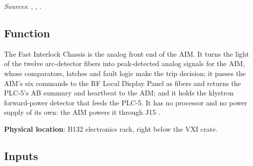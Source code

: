 \emph{Sources}: , , .


\subsection{Function}\label{sec:fastic-function}


The Fast Interlock Chassis is the analog front end of the AIM. It turns the light of the twelve arc-detector fibers into peak-detected analog signals for the AIM, whose comparators, latches and fault logic make the trip decision; it passes the AIM's six commands to the RF Local Display Panel as fibers and returns the PLC-5's AB summary and heartbeat to the AIM; and it holds the klystron forward-power detector that feeds the PLC-5. It has no processor and no power supply of its own: the AIM powers it through J15 .

\textbf{Physical location}: B132 electronics rack, right below the VXI crate.

\subsection{Inputs}\label{sec:fastic-inputs}



